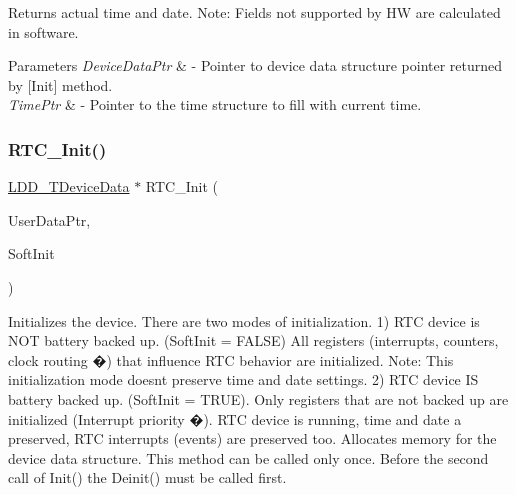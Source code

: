 Returns actual time and date. Note\+: Fields not supported by HW are calculated in software. 


\begin{DoxyParams}{Parameters}
{\em Device\+Data\+Ptr} & -\/ Pointer to device data structure pointer returned by \mbox{[}Init\mbox{]} method. \\
\hline
{\em Time\+Ptr} & -\/ Pointer to the time structure to fill with current time. \\
\hline
\end{DoxyParams}
\mbox{\label{group___r_t_c__module_ga8493e21872f656aa30a9e13b522aa1cb}} 
\subsubsection{\texorpdfstring{R\+T\+C\+\_\+\+Init()}{RTC\_Init()}}
{\footnotesize\ttfamily \hyperlink{group___p_e___types__module_gac5cf1362f1f0e3a2ce71b1bf2276d091}{L\+D\+D\+\_\+\+T\+Device\+Data} $\ast$ R\+T\+C\+\_\+\+Init (\begin{DoxyParamCaption}\item[{\hyperlink{group___p_e___types__module_ga0b66a73f87238a782318aa0be7578e35}{L\+D\+D\+\_\+\+T\+User\+Data} $\ast$}]{User\+Data\+Ptr,  }\item[{bool}]{Soft\+Init }\end{DoxyParamCaption})}



Initializes the device. There are two modes of initialization. 1) R\+TC device is N\+OT battery backed up. (Soft\+Init = F\+A\+L\+SE) All registers (interrupts, counters, clock routing �) that influence R\+TC behavior are initialized. Note\+: This initialization mode doesn\textquotesingle{}t preserve time and date settings. 2) R\+TC device IS battery backed up. (Soft\+Init = T\+R\+UE). Only registers that are not backed up are initialized (Interrupt priority �). R\+TC device is running, time and date a preserved, R\+TC interrupts (events) are preserved too. Allocates memory for the device data structure. This method can be called only once. Before the second call of Init() the Deinit() must be called first. 



